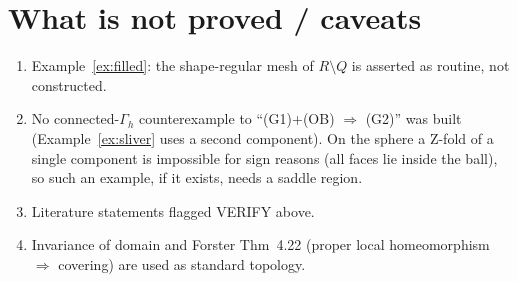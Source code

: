 \documentclass[11pt]{article}
\theoremstyle{definition}
\newcommand{\Gh}{\Gamma_h}
\begin{document}
\section{What is not proved / caveats}
\begin{enumerate}
\item Example~\ref{ex:filled}: the shape-regular mesh of $R\setminus Q$ is asserted as routine, not constructed.
\item No connected-$\Gh$ counterexample to ``(G1)+(OB) $\Rightarrow$ (G2)'' was built (Example~\ref{ex:sliver} uses a second component). On the sphere a Z-fold of a single component is impossible for sign reasons (all faces lie inside the ball), so such an example, if it exists, needs a saddle region.
\item Literature statements flagged VERIFY above.
\item Invariance of domain and Forster Thm~4.22 (proper local homeomorphism $\Rightarrow$ covering) are used as standard topology.
\end{enumerate}
\end{document}
